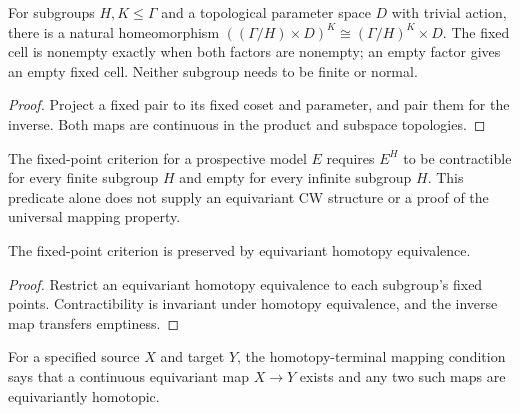 \begin{proposition}\label{prop:orbit-cell-fixed-product}
\leanok
For subgroups $H,K\leq\Gamma$ and a topological parameter space $D$ with
trivial action, there is a natural homeomorphism
$((\Gamma/H)\times D)^K\cong(\Gamma/H)^K\times D$.
The fixed cell is nonempty exactly when both factors are nonempty; an
empty factor gives an empty fixed cell. Neither subgroup needs to be
finite or normal.
\end{proposition}
\begin{proof}
\leanok
Project a fixed pair to its fixed coset and parameter, and pair them for
the inverse. Both maps are continuous in the product and subspace topologies.
\end{proof}

\begin{definition}\label{def:proper-model-fixed-point-criterion}
\leanok
The fixed-point criterion for a prospective model $E$ requires $E^H$ to
be contractible for every finite subgroup $H$ and empty for every infinite
subgroup $H$. This predicate alone does not supply an equivariant CW
structure or a proof of the universal mapping property.
\end{definition}

\begin{proposition}\label{prop:fixed-point-criterion-invariance}
The fixed-point criterion is preserved by equivariant homotopy equivalence.
\end{proposition}
\begin{proof}
\leanok
Restrict an equivariant homotopy equivalence to each subgroup's fixed
points. Contractibility is invariant under homotopy equivalence, and the
inverse map transfers emptiness.
\end{proof}

\begin{definition}\label{def:homotopy-terminal-for}
\leanok
For a specified source $X$ and target $Y$, the homotopy-terminal mapping
condition says that a continuous equivariant map $X\to Y$ exists and any
two such maps are equivariantly homotopic.
\end{definition}

